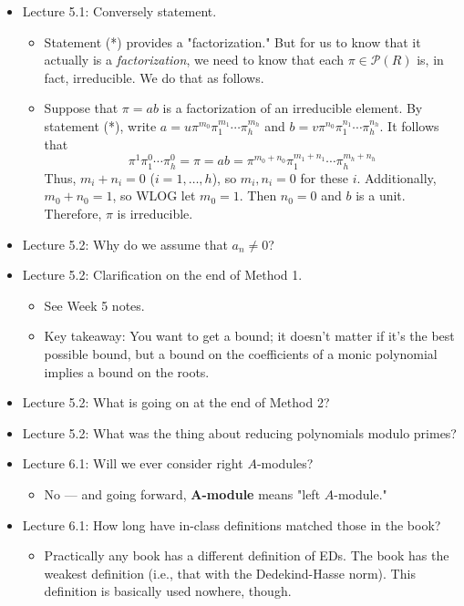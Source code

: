 \documentclass[../notes.tex]{subfiles}
\begin{document}
\begin{itemize}
    \item Lecture 5.1: Conversely statement.
    \begin{itemize}
        \item Statement (*) provides a "factorization." But for us to know that it actually is a \emph{factorization}, we need to know that each $\pi\in\mathcal{P}(R)$ is, in fact, irreducible. We do that as follows.
        \item Suppose that $\pi=ab$ is a factorization of an irreducible element. By statement (*), write $a=u\pi^{m_0}\pi_1^{m_1}\cdots\pi_h^{m_h}$ and $b=v\pi^{n_0}\pi_1^{n_1}\cdots\pi_h^{n_h}$. It follows that
        \begin{equation*}
            \pi^1\pi_1^0\cdots\pi_h^0 = \pi = ab = \pi^{m_0+n_0}\pi_1^{m_1+n_1}\cdots\pi_h^{m_h+n_h}
        \end{equation*}
        Thus, $m_i+n_i=0$ ($i=1,\dots,h$), so $m_i,n_i=0$ for these $i$. Additionally, $m_0+n_0=1$, so WLOG let $m_0=1$. Then $n_0=0$ and $b$ is a unit. Therefore, $\pi$ is irreducible.
    \end{itemize}
    \item Lecture 5.2: Why do we assume that $a_n\neq 0$?
    \item Lecture 5.2: Clarification on the end of Method 1.
    \begin{itemize}
        \item See Week 5 notes.
        \item Key takeaway: You want to get a bound; it doesn't matter if it's the best possible bound, but a bound on the coefficients of a monic polynomial implies a bound on the roots.
    \end{itemize}
    \item Lecture 5.2: What is going on at the end of Method 2?
    \item Lecture 5.2: What was the thing about reducing polynomials modulo primes?
    \item Lecture 6.1: Will we ever consider right $A$-modules?
    \begin{itemize}
        \item No --- and going forward, \textbf{$\bm{A}$-module} means "left $A$-module."
    \end{itemize}
    \item Lecture 6.1: How long have in-class definitions matched those in the book?
    \begin{itemize}
        \item Practically any book has a different definition of EDs. The book has the weakest definition (i.e., that with the Dedekind-Hasse norm). This definition is basically used nowhere, though.

\end{itemize}
\end{itemize}
\end{document}
